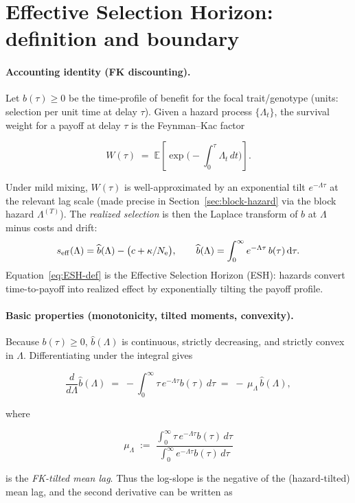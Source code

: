 \documentclass[11pt]{article}
\theoremstyle{upright}
\newcommand{\Ne}{N_{\mathrm{e}}}
\newcommand{\seff}[1][]{s_{\mathrm{eff}\if\relax\detokenize{#1}\relax\else,#1\fi}}
\newcommand{\hazT}[1]{\Lambda^{(#1)}}          %
\begin{document}
\section{Effective Selection Horizon: definition and boundary}
\label{sec:esh}
\paragraph{Accounting identity (FK discounting).}
Let $b(\tau)\ge 0$ be the time-profile of benefit for the focal trait/genotype (units: selection per unit time at delay $\tau$). Given a hazard process $\{\Lambda_t\}$, the survival weight for a payoff at delay $\tau$ is the Feynman--Kac factor

$$
W(\tau)\;=\;\mathbb{E}\!\left[\exp\!\Big(-\int_0^\tau \Lambda_t\,dt\Big)\right].
$$

Under mild mixing, $W(\tau)$ is well-approximated by an exponential tilt $e^{-\Lambda \tau}$ at the relevant lag scale (made precise in Section~\ref{sec:block-hazard} via the block hazard $\hazT{T}$). The \emph{realized selection} is then the Laplace transform of $b$ at $\Lambda$ minus costs and drift:
\begin{equation}
\label{eq:ESH-def}
\seff(\Lambda)=\widehat b(\Lambda)-\big(c+\kappa/\Ne\big),
\qquad
\widehat b(\Lambda)=\int_{0}^{\infty} e^{-\Lambda \tau}\, b(\tau)\,\mathrm{d}\tau.
\end{equation}
Equation~\eqref{eq:ESH-def} is the Effective Selection Horizon (ESH): hazards convert time-to-payoff into realized effect by exponentially tilting the payoff profile.

\paragraph{Basic properties (monotonicity, tilted moments, convexity).}
Because $b(\tau)\ge 0$, $\widehat b(\Lambda)$ is continuous, strictly decreasing, and strictly convex in $\Lambda$. Differentiating under the integral gives

$$
\frac{d}{d\Lambda}\widehat b(\Lambda)\;=\;-\int_0^\infty \tau\,e^{-\Lambda \tau} b(\tau)\,d\tau
\;=\; -\,\mu_\Lambda\,\widehat b(\Lambda),
$$

where

$$
\mu_\Lambda\;:=\;\frac{\int_0^\infty \tau\,e^{-\Lambda \tau} b(\tau)\,d\tau}{\int_0^\infty e^{-\Lambda \tau} b(\tau)\,d\tau}
$$

is the \emph{FK-tilted mean lag}. Thus the log-slope is the negative of the (hazard-tilted) mean lag, and the second derivative can be written as
\end{document}
